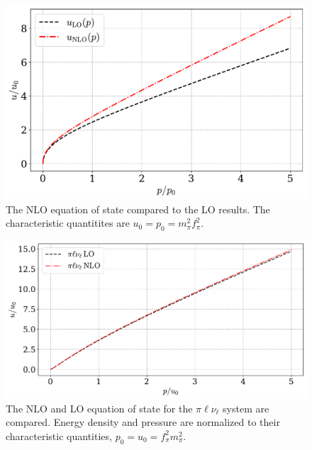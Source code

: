 \begin{figure}
    \centering
    \includegraphics[width=.75\textwidth]{../scripts/figurer/pion_eos_nlo.pdf}
    \caption{The NLO equation of state compared to the LO results. The characteristic quantitites are $u_0 = p_0 = m_\pi^2 f_\pi^2$.}
    \label{fig: nlo eos}
\end{figure}

\begin{figure}[!htb]
    \centering
    \includegraphics[width=.75\textwidth]{../scripts/figurer/pion_star/neutrino_nlo_eos.pdf}
    \caption{The NLO and LO equation of state for the $\pi \ell \nu_\ell$ system are compared. Energy density and pressure are normalized to their characteristic quantities, $p_0 = u_0 = f_\pi^2m_\pi^2$.}
    \label{fig: eos pi ell nu}
\end{figure}  